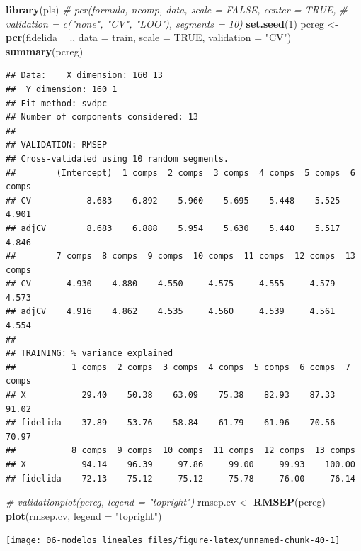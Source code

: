 \documentclass[
  spanish,
]{book}
\newenvironment{Shaded}{\begin{snugshade}}{\end{snugshade}}
\newcommand{\CommentTok}[1]{\textcolor[rgb]{0.56,0.35,0.01}{\textit{#1}}}
\newcommand{\DataTypeTok}[1]{\textcolor[rgb]{0.13,0.29,0.53}{#1}}
\newcommand{\DecValTok}[1]{\textcolor[rgb]{0.00,0.00,0.81}{#1}}
\newcommand{\KeywordTok}[1]{\textcolor[rgb]{0.13,0.29,0.53}{\textbf{#1}}}
\newcommand{\NormalTok}[1]{#1}
\newcommand{\OperatorTok}[1]{\textcolor[rgb]{0.81,0.36,0.00}{\textbf{#1}}}
\newcommand{\OtherTok}[1]{\textcolor[rgb]{0.56,0.35,0.01}{#1}}
\newcommand{\StringTok}[1]{\textcolor[rgb]{0.31,0.60,0.02}{#1}}
\theoremstyle{break}
\theoremstyle{definition}
\theoremstyle{definition}
\theoremstyle{definition}
\theoremstyle{remark}
\begin{document}
\begin{Shaded}
\begin{Highlighting}[]
\KeywordTok{library}\NormalTok{(pls)}
\CommentTok{# pcr(formula, ncomp, data, scale = FALSE, center = TRUE, }
\CommentTok{#     validation = c("none", "CV", "LOO"), segments = 10)}
\KeywordTok{set.seed}\NormalTok{(}\DecValTok{1}\NormalTok{)}
\NormalTok{pcreg <-}\StringTok{ }\KeywordTok{pcr}\NormalTok{(fidelida }\OperatorTok{~}\StringTok{ }\NormalTok{., }\DataTypeTok{data =}\NormalTok{ train, }\DataTypeTok{scale =} \OtherTok{TRUE}\NormalTok{, }\DataTypeTok{validation =} \StringTok{"CV"}\NormalTok{)}
\KeywordTok{summary}\NormalTok{(pcreg)}
\end{Highlighting}
\end{Shaded}

\begin{verbatim}
## Data:    X dimension: 160 13 
##  Y dimension: 160 1
## Fit method: svdpc
## Number of components considered: 13
## 
## VALIDATION: RMSEP
## Cross-validated using 10 random segments.
##        (Intercept)  1 comps  2 comps  3 comps  4 comps  5 comps  6 comps
## CV           8.683    6.892    5.960    5.695    5.448    5.525    4.901
## adjCV        8.683    6.888    5.954    5.630    5.440    5.517    4.846
##        7 comps  8 comps  9 comps  10 comps  11 comps  12 comps  13 comps
## CV       4.930    4.880    4.550     4.575     4.555     4.579     4.573
## adjCV    4.916    4.862    4.535     4.560     4.539     4.561     4.554
## 
## TRAINING: % variance explained
##           1 comps  2 comps  3 comps  4 comps  5 comps  6 comps  7 comps
## X           29.40    50.38    63.09    75.38    82.93    87.33    91.02
## fidelida    37.89    53.76    58.84    61.79    61.96    70.56    70.97
##           8 comps  9 comps  10 comps  11 comps  12 comps  13 comps
## X           94.14    96.39     97.86     99.00     99.93    100.00
## fidelida    72.13    75.12     75.12     75.78     76.00     76.14
\end{verbatim}

\begin{Shaded}
\begin{Highlighting}[]
\CommentTok{# validationplot(pcreg, legend = "topright") }
\NormalTok{rmsep.cv <-}\StringTok{ }\KeywordTok{RMSEP}\NormalTok{(pcreg)}
\KeywordTok{plot}\NormalTok{(rmsep.cv, }\DataTypeTok{legend =} \StringTok{"topright"}\NormalTok{)}
\end{Highlighting}
\end{Shaded}

\begin{center}\texttt{[image: 06-modelos\_lineales\_files/figure-latex/unnamed-chunk-40-1]} \end{center}
\end{document}
